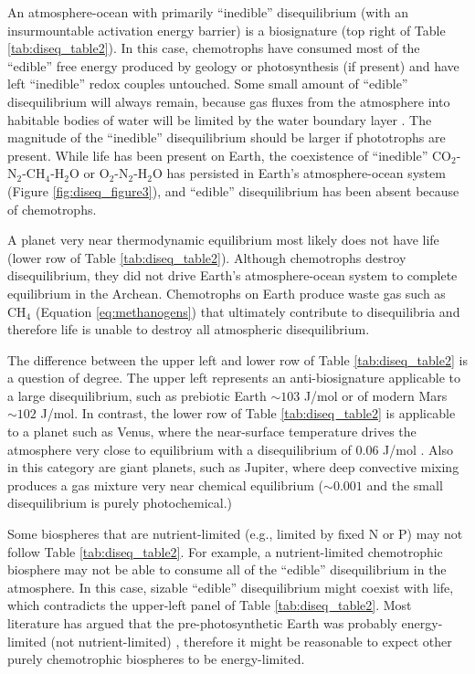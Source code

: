 An atmosphere-ocean with primarily ``inedible'' disequilibrium (with an insurmountable activation energy barrier) is a biosignature (top right of Table \ref{tab:diseq_table2}). In this case, chemotrophs have consumed most of the ``edible'' free energy produced by geology or photosynthesis (if present) and have left ``inedible'' redox couples untouched. Some small amount of ``edible'' disequilibrium will always remain, because gas fluxes from the atmosphere into habitable bodies of water will be limited by the water boundary layer \citep{Liss_1974}. The magnitude of the ``inedible'' disequilibrium should be larger if phototrophs are present. While life has been present on Earth, the coexistence of ``inedible'' CO$_2$-N$_2$-CH$_4$-H$_2$O or O$_2$-N$_2$-H$_2$O has persisted in Earth's atmosphere-ocean system (Figure \ref{fig:diseq_figure3}), and ``edible'' disequilibrium has been absent because of chemotrophs.

A planet very near thermodynamic equilibrium most likely does not have life (lower row of Table \ref{tab:diseq_table2}). Although chemotrophs destroy disequilibrium, they did not drive Earth's atmosphere-ocean system to complete equilibrium in the Archean. Chemotrophs on Earth produce waste gas such as CH$_4$ (Equation \eqref{eq:methanogens}) that ultimately contribute to disequilibria and therefore life is unable to destroy all atmospheric disequilibrium.

The difference between the upper left and lower row of Table \ref{tab:diseq_table2} is a question of degree. The upper left represents an anti-biosignature applicable to a large disequilibrium, such as prebiotic Earth $\sim 103$ J/mol or of modern Mars $\sim 102$ J/mol. In contrast, the lower row of Table \ref{tab:diseq_table2} is applicable to a planet such as Venus, where the near-surface temperature drives the atmosphere very close to equilibrium with a disequilibrium of 0.06 J/mol \citep{KrissansenTotton_2016}. Also in this category are giant planets, such as Jupiter, where deep convective mixing produces a gas mixture very near chemical equilibrium ($\sim 0.001$ and the small disequilibrium is purely photochemical.)

Some biospheres that are nutrient-limited (e.g., limited by fixed N or P) may not follow Table \ref{tab:diseq_table2}. For example, a nutrient-limited chemotrophic biosphere may not be able to consume all of the ``edible'' disequilibrium in the atmosphere. In this case, sizable ``edible'' disequilibrium might coexist with life, which contradicts the upper-left panel of Table \ref{tab:diseq_table2}. Most literature has argued that the pre-photosynthetic Earth was probably energy-limited (not nutrient-limited) \citep{Canfield_2006,Kharecha_2005,Ward_2019}, therefore it might be reasonable to expect other purely chemotrophic biospheres to be energy-limited.

